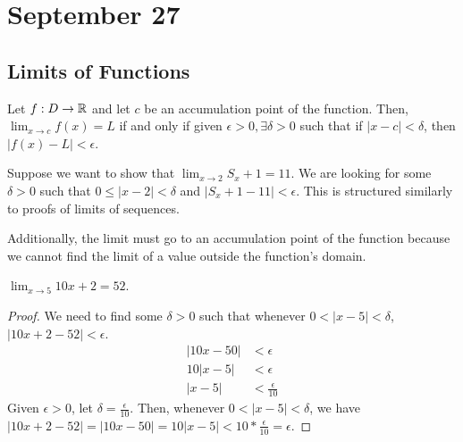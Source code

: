 \section{September 27}

\subsection{Limits of Functions}
\begin{definition}
    Let $f:D \to \mathbb{R}$ and let $c$ be an accumulation point of the function. Then, $\lim_{x \to c} f(x) = L$ if and only if given $\epsilon > 0, \exists \delta > 0$ such that if $|x - c| < \delta$, then $|f(x) - L| < \epsilon$.
\end{definition}
\begin{remark}
    Suppose we want to show that $\lim_{x \to 2} S_x + 1 = 11$. We are looking for some $\delta > 0$ such that $0 \leq |x  - 2| < \delta$ and $|S_x + 1 - 11| < \epsilon$. This is structured similarly to proofs of limits of sequences.

    Additionally, the limit must go to an accumulation point of the function because we cannot find the limit of a value outside the function's domain.
\end{remark}

\begin{theorem}
    $\lim_{x \to 5} 10x + 2 = 52$.
\end{theorem}
\begin{proof}
    We need to find some $\delta > 0$ such that whenever $0 < |x - 5| < \delta$, $|10x + 2 - 52| < \epsilon$.
    \begin{align*}
        |10x - 50| &< \epsilon \\
        10|x - 5| &< \epsilon \\
        |x - 5| &< \frac{\epsilon}{10}
    \end{align*}
    Given $\epsilon > 0$, let $\delta = \frac{\epsilon}{10}$. Then, whenever $0 < |x - 5| < \delta$, we have $|10x + 2 - 52| = |10x - 50| = 10|x - 5| < 10 * \frac{\epsilon}{10} = \epsilon$.
\end{proof}

